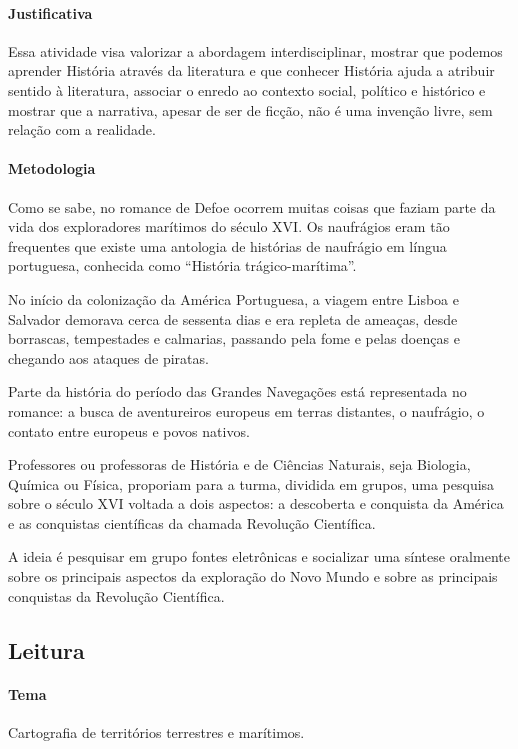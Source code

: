 \documentclass{article}
\begin{document}
\paragraph{Justificativa}
Essa atividade visa valorizar a abordagem interdisciplinar, mostrar que
podemos aprender História através da literatura e que conhecer História
ajuda a atribuir sentido à literatura, associar o enredo ao contexto
social, político e histórico e mostrar que a narrativa, apesar de ser de
ficção, não é uma invenção livre, sem relação com a realidade.

\paragraph{Metodologia}
Como se sabe, no romance de Defoe ocorrem muitas coisas que faziam parte
da vida dos exploradores marítimos do século XVI. Os naufrágios eram tão
frequentes que existe uma antologia de histórias de naufrágio em língua
portuguesa, conhecida como ``História trágico-marítima''.

No início da colonização da América Portuguesa, a viagem entre Lisboa e
Salvador demorava cerca de sessenta dias e era repleta de ameaças, desde
borrascas, tempestades e calmarias, passando pela fome e pelas doenças e
chegando aos ataques de piratas.

Parte da história do período das Grandes Navegações está representada no
romance: a busca de aventureiros europeus em terras distantes, o
naufrágio, o contato entre europeus e povos nativos.

Professores ou professoras de História e de Ciências Naturais, seja
Biologia, Química ou Física, proporiam para a turma, dividida em grupos,
uma pesquisa sobre o século XVI voltada a dois aspectos: a descoberta e
conquista da América e as conquistas científicas da chamada Revolução
Científica.

A ideia é pesquisar em grupo fontes eletrônicas e socializar uma síntese
oralmente sobre os principais aspectos da exploração do Novo Mundo e
sobre as principais conquistas da Revolução Científica.

\subsection{Leitura}

\paragraph{Tema} Cartografia de territórios terrestres e marítimos.
\end{document}
